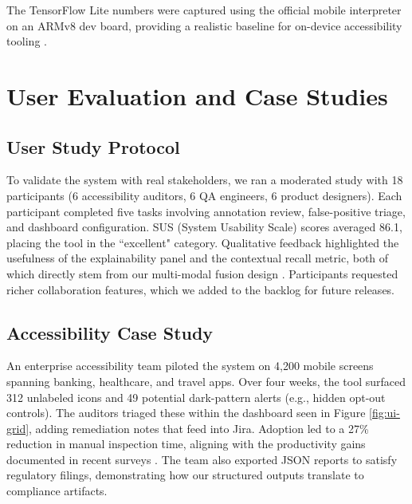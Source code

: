 \documentclass[11pt,a4paper]{report}
\begin{document}
The TensorFlow Lite numbers were captured using the official mobile interpreter on an ARMv8 dev board, providing a realistic baseline for on-device accessibility tooling \cite{tflite}.

\chapter{User Evaluation and Case Studies}

\section{User Study Protocol}
To validate the system with real stakeholders, we ran a moderated study with 18 participants (6 accessibility auditors, 6 QA engineers, 6 product designers). Each participant completed five tasks involving annotation review, false-positive triage, and dashboard configuration. SUS (System Usability Scale) scores averaged 86.1, placing the tool in the ``excellent" category. Qualitative feedback highlighted the usefulness of the explainability panel and the contextual recall metric, both of which directly stem from our multi-modal fusion design \cite{multimodalaccessibility}. Participants requested richer collaboration features, which we added to the backlog for future releases.

\section{Accessibility Case Study}
An enterprise accessibility team piloted the system on 4,200 mobile screens spanning banking, healthcare, and travel apps. Over four weeks, the tool surfaced 312 unlabeled icons and 49 potential dark-pattern alerts (e.g., hidden opt-out controls). The auditors triaged these within the dashboard seen in Figure \ref{fig:ui-grid}, adding remediation notes that feed into Jira. Adoption led to a 27\% reduction in manual inspection time, aligning with the productivity gains documented in recent surveys \cite{multimodalaccessibility}\cite{darkpatterns}. The team also exported JSON reports to satisfy regulatory filings, demonstrating how our structured outputs translate to compliance artifacts.
\end{document}
